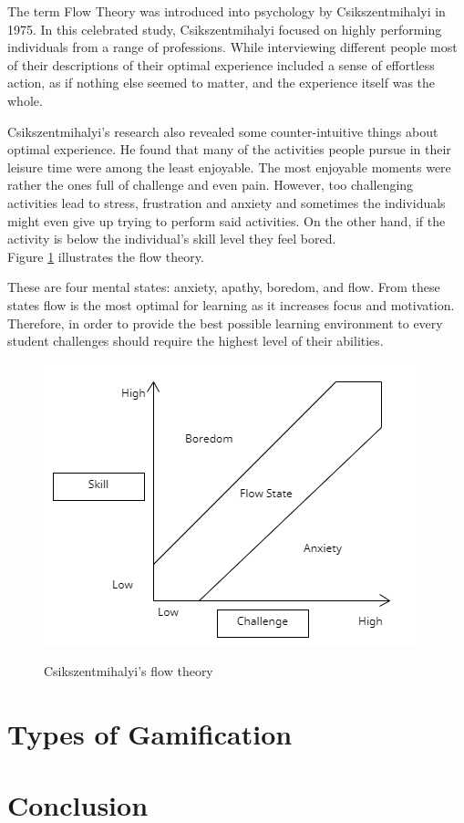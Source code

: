 \documentclass[10pt,oneside,english,a4paper]{article}
\begin{document}
\par
The term Flow Theory was introduced into psychology by Csikszentmihalyi in 1975.\cite{1990flow} In this celebrated study, Csikszentmihalyi focused on highly performing individuals from a range of professions. While interviewing different people most of their descriptions of their optimal experience included a sense of effortless action, as if nothing else seemed to matter, and the experience itself was the whole.\cite{runco}
\par
Csikszentmihalyi’s research also revealed some counter-intuitive things about optimal experience. He found that many of the activities people pursue in their leisure time were among the least enjoyable. The most enjoyable moments were rather the ones full of challenge and even pain. However, too challenging activities lead to stress, frustration and anxiety and sometimes the individuals might even give up trying to perform said activities. On the other hand, if the activity is below the individual's skill level they feel bored. \\Figure \ref{flowstate}  illustrates the flow theory.
\par
These are four mental states: anxiety, apathy, boredom, and flow. From these states flow is the most optimal for learning as it increases focus and motivation. Therefore, in order to provide the best possible learning environment to every student challenges should require the highest level of their abilities. \cite{Hu:gamification}
\begin{figure}[h]
\caption{Csikszentmihalyi’s flow theory}
\includegraphics[scale=0.8]{Flowstate}
\label{flowstate}
\end{figure}





\section{Types of Gamification} \label{gamification}



\section{Conclusion} \label{Conclusion} 




\end{document}
